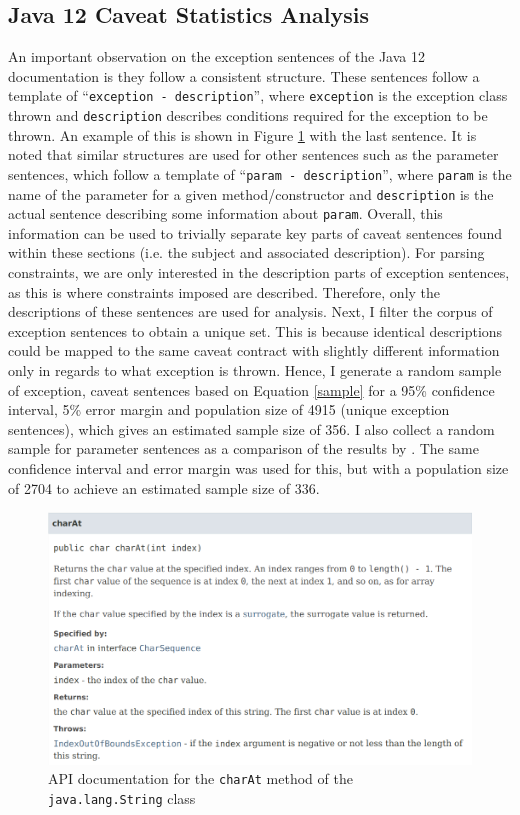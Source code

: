 \subsection{Java 12 Caveat Statistics Analysis}
\label{subsec:contract-caveat-statistics}
An important observation on the exception sentences of the Java 12 documentation is they follow a consistent structure. These sentences follow a template of ``\verb|exception - description|'', where \verb|exception| is the exception class thrown and \verb|description| describes conditions required for the exception to be thrown. An example of this is shown in Figure \ref{fig:api-doc-charAt} with the last sentence. It is noted that similar structures are used for other sentences such as the parameter sentences, which follow a template of ``\verb|param - description|'', where \verb|param| is the name of the parameter for a given method/constructor and \verb|description| is the actual sentence describing some information about \verb|param|.  Overall, this information can be used to trivially separate key parts of caveat sentences found within these sections (i.e. the subject and associated description). For parsing constraints, we are only interested in the description parts of exception sentences, as this is where constraints imposed are described. Therefore, only the descriptions of these sentences are used for analysis. Next, I filter the corpus of exception sentences to obtain a unique set. This is because identical descriptions could be mapped to the same caveat contract with slightly different information only in regards to what exception is thrown.  
Hence, I generate a random sample of exception, caveat sentences based on Equation \ref{sample} for a 95\% confidence interval, 5\% error margin and population size of 4915 (unique exception sentences), which gives an estimated sample size of 356. I also collect a random sample for parameter sentences as a comparison of the results by \cite{zhou-directive}. The same confidence interval and error margin was used for this, but with a population size of 2704 to achieve an estimated sample size of 336.\\

\begin{figure}[h]
	\label{fig:api-doc-charAt}
	\centering
	\includegraphics[width=\textwidth]{figs/api-doc-charAt.png}
	\caption{API documentation for the \lstinline{charAt} method of the \lstinline{java.lang.String} class}
\end{figure}

